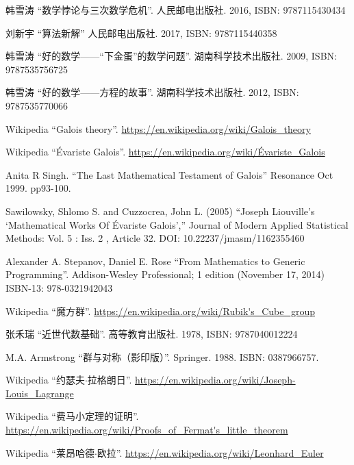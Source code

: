 \documentclass{article}
\begin{document}
\ifx\wholebook\relax \else
\begin{thebibliography}{99}

{\fontspec{\cnmainft}韩雪涛 ``数学悖论与三次数学危机''. 人民邮电出版社.} 2016, ISBN: 9787115430434

{\fontspec{\cnmainft}刘新宇 ``算法新解'' 人民邮电出版社.} 2017, ISBN: 9787115440358

{\fontspec{\cnmainft}韩雪涛 ``好的数学——“下金蛋”的数学问题''. 湖南科学技术出版社.} 2009, ISBN: 9787535756725

{\fontspec{\cnmainft}韩雪涛 ``好的数学——方程的故事''. 湖南科学技术出版社.} 2012, ISBN: 9787535770066

Wikipedia ``Galois theory''. \url{https://en.wikipedia.org/wiki/Galois_theory}

Wikipedia ``Évariste Galois''. \url{https://en.wikipedia.org/wiki/Évariste_Galois}

Anita R Singh. ``The Last Mathematical Testament of Galois'' Resonance Oct 1999. pp93-100.

Sawilowsky, Shlomo S. and Cuzzocrea, John L. (2005) ``Joseph Liouville’s `Mathematical Works Of Évariste Galois','' Journal of Modern Applied Statistical Methods: Vol. 5 : Iss. 2 , Article 32. DOI: 10.22237/jmasm/1162355460

Alexander A. Stepanov, Daniel E. Rose ``From Mathematics to Generic Programming''. Addison-Wesley Professional; 1 edition (November 17, 2014) ISBN-13: 978-0321942043

Wikipedia ``魔方群''. \url{https://en.wikipedia.org/wiki/Rubik's_Cube_group}

张禾瑞 ``近世代数基础''. 高等教育出版社. 1978, ISBN: 9787040012224

M.A. Armstrong ``群与对称（影印版）''. Springer. 1988. ISBN: 0387966757.

Wikipedia ``约瑟夫$\cdot$拉格朗日''. \url{https://en.wikipedia.org/wiki/Joseph-Louis_Lagrange}

Wikipedia ``费马小定理的证明''. \url{https://en.wikipedia.org/wiki/Proofs_of_Fermat's_little_theorem}

Wikipedia ``莱昂哈德$\cdot$欧拉''. \url{https://en.wikipedia.org/wiki/Leonhard_Euler}


\end{thebibliography}
\end{document}
